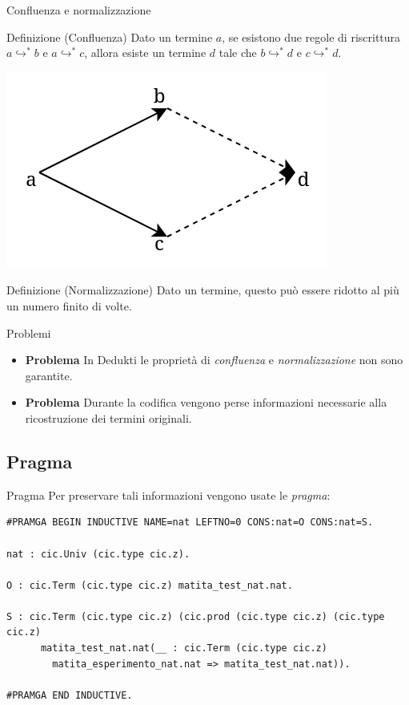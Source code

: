 \documentclass{beamer}
\begin{document}
\begin{frame}{Confluenza e normalizzazione}
  \begin{block}{Definizione (Confluenza)} 
    Dato un termine $a$, se esistono due regole di riscrittura $a \hookrightarrow^* b$ e 
    $a \hookrightarrow^*c$, allora esiste un termine $d$ tale che $b \hookrightarrow^* d$
    e $c \hookrightarrow^* d$.
  \end{block}
  \begin{center}
    \includegraphics[scale=0.40]{confluenza.png}
  \end{center}
  \begin{block}{Definizione (Normalizzazione)} 
    Dato un termine, questo può essere ridotto al più un numero finito di volte.
  \end{block}
\end{frame}

\begin{frame}{Problemi}
\begin{itemize}
  \item \alert{\textbf{Problema}} In Dedukti le proprietà di \textit{confluenza} e 
    \textit{normalizzazione} non sono garantite.
  \vspace{1em}
  \item \alert{\textbf{Problema}} Durante la codifica vengono perse informazioni necessarie
    alla ricostruzione dei termini originali.
\end{itemize}
\end{frame}

\subsection{Pragma}
\begin{frame}[fragile]{Pragma}
Per preservare tali informazioni vengono usate le \textit{pragma}:
  \vspace{1em}
  \begin{lstlisting}
#PRAMGA BEGIN INDUCTIVE NAME=nat LEFTNO=0 CONS:nat=O CONS:nat=S.

nat : cic.Univ (cic.type cic.z).

O : cic.Term (cic.type cic.z) matita_test_nat.nat.
      
S : cic.Term (cic.type cic.z) (cic.prod (cic.type cic.z) (cic.type cic.z)
      matita_test_nat.nat(__ : cic.Term (cic.type cic.z)
        matita_esperimento_nat.nat => matita_test_nat.nat)).
      
#PRAMGA END INDUCTIVE.
  \end{lstlisting}
\end{frame}
\end{document}
